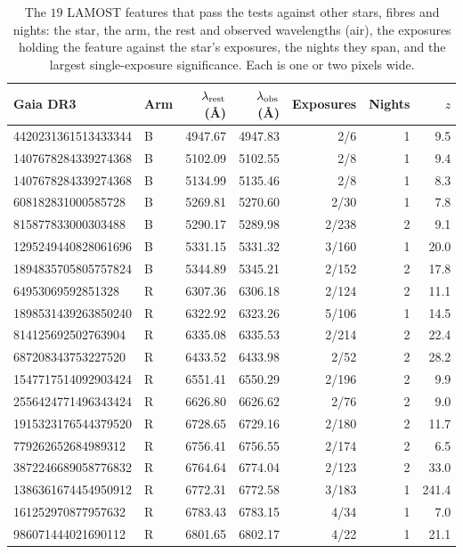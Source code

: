 \documentclass[3p,11pt]{elsarticle}
\begin{document}
\begin{table}[tp]
\centering\small
\setlength{\tabcolsep}{5pt}
\caption{The $19$ LAMOST features that pass the tests against other stars, fibres and
nights: the star, the arm, the rest and observed wavelengths (air), the exposures
holding the feature against the star's exposures, the nights they span, and the largest
single-exposure significance. Each is one or two pixels wide.}
\label{tab:lamost}
\begin{tabular}{l l r r r r r}
\toprule
Gaia DR3 & Arm & $\lambda_{\rm rest}$ (\AA) & $\lambda_{\rm obs}$ (\AA) & Exposures & Nights & $z$ \\
\midrule
4420231361513433344 & B & 4947.67 & 4947.83 & 2/6 & 1 & 9.5 \\
1407678284339274368 & B & 5102.09 & 5102.55 & 2/8 & 1 & 9.4 \\
1407678284339274368 & B & 5134.99 & 5135.46 & 2/8 & 1 & 8.3 \\
608182831000585728 & B & 5269.81 & 5270.60 & 2/30 & 1 & 7.8 \\
815877833000303488 & B & 5290.17 & 5289.98 & 2/238 & 2 & 9.1 \\
1295249440828061696 & B & 5331.15 & 5331.32 & 3/160 & 1 & 20.0 \\
1894835705805757824 & B & 5344.89 & 5345.21 & 2/152 & 2 & 17.8 \\
64953069592851328 & R & 6307.36 & 6306.18 & 2/124 & 2 & 11.1 \\
1898531439263850240 & R & 6322.92 & 6323.26 & 5/106 & 1 & 14.5 \\
814125692502763904 & R & 6335.08 & 6335.53 & 2/214 & 2 & 22.4 \\
687208343753227520 & R & 6433.52 & 6433.98 & 2/52 & 2 & 28.2 \\
1547717514092903424 & R & 6551.41 & 6550.29 & 2/196 & 2 & 9.9 \\
2556424771496343424 & R & 6626.80 & 6626.62 & 2/76 & 2 & 9.0 \\
1915323176544379520 & R & 6728.65 & 6729.16 & 2/180 & 2 & 11.7 \\
779262652684989312 & R & 6756.41 & 6756.55 & 2/174 & 2 & 6.5 \\
3872246689058776832 & R & 6764.64 & 6774.04 & 2/123 & 2 & 33.0 \\
1386361674454950912 & R & 6772.31 & 6772.58 & 3/183 & 1 & 241.4 \\
161252970877957632 & R & 6783.43 & 6783.15 & 4/34 & 1 & 7.0 \\
986071444021690112 & R & 6801.65 & 6802.17 & 4/22 & 1 & 21.1 \\
\bottomrule
\end{tabular}
\end{table}
\end{document}
